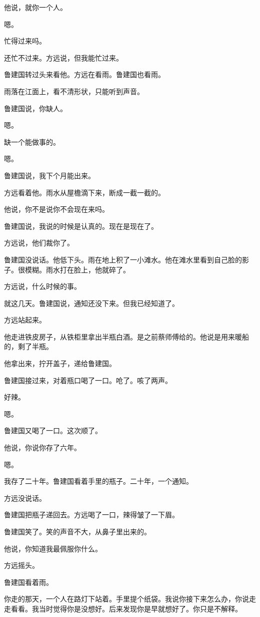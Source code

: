 \documentclass[UTF8,a5paper,11pt,openany]{ctexbook}
\begin{document}
他说，就你一个人。

嗯。

忙得过来吗。

还忙不过来。方远说，但我能忙过来。

鲁建国转过头来看他。方远在看雨。鲁建国也看雨。

雨落在江面上，看不清形状，只能听到声音。

鲁建国说，你缺人。

嗯。

缺一个能做事的。

嗯。

鲁建国说，我下个月能出来。

方远看着他。雨水从屋檐滴下来，断成一截一截的。

他说，你不是说你不会现在来吗。

鲁建国说，我说的时候是认真的。现在是现在了。

方远说，他们裁你了。

鲁建国没说话。他低下头。雨在地上积了一小滩水。他在滩水里看到自己脸的影子。很模糊。雨水打在脸上，他就碎了。

方远说，什么时候的事。

就这几天。鲁建国说，通知还没下来。但我已经知道了。

方远站起来。

他走进铁皮房子，从铁柜里拿出半瓶白酒。是之前蔡师傅给的。他说是用来暖船的，剩了半瓶。

他拿出来，拧开盖子，递给鲁建国。

鲁建国接过来，对着瓶口喝了一口。呛了。咳了两声。

好辣。

嗯。

鲁建国又喝了一口。这次顺了。

他说，你说你存了六年。

嗯。

我存了二十年。鲁建国看着手里的瓶子。二十年，一个通知。

方远没说话。

鲁建国把瓶子递回去。方远喝了一口，辣得皱了一下眉。

鲁建国笑了。笑的声音不大，从鼻子里出来的。

他说，你知道我最佩服你什么。

方远摇头。

鲁建国看着雨。

你走的那天，一个人在路灯下站着。手里提个纸袋。我说你接下来怎么办，你说走走看看。我当时觉得你是没想好。后来发现你是早就想好了。你只是不解释。
\end{document}
